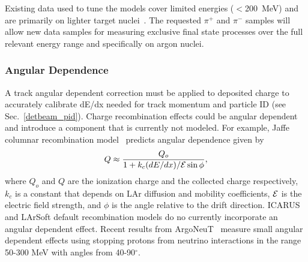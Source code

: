 Existing data used to tune the models
cover limited energies ($<$200~MeV) and are primarily on lighter target nuclei~\cite{fsirev}.
The requested $\pi^+$ and $\pi^-$ samples will allow new data samples for measuring
exclusive final state processes over the full relevant energy range and specifically on argon nuclei. 



 


\subsubsection{Angular Dependence}

\label{sec_angle}


A track angular dependent correction must be
applied to deposited charge to accurately calibrate
dE/dx needed for track momentum and particle ID (see Sec.~\ref{detbeam_pid}). 
Charge recombination effects could be angular dependent and
introduce a component that
is currently not modeled. 
For example, Jaffe columnar recombination model~\cite{jaffe,eqref} predicts 
angular dependence given by 
$$Q \approx \frac{Q_o}{1+k_c (dE/dx) / {\cal E} \sin\phi}, $$ 
where
$Q_o$ and $Q$ are the ionization charge and the collected charge respectively, 
$k_c$ is a constant that depends on LAr diffusion and mobility coefficients, $\cal E$ 
is the electric field strength, and $\phi$ is the angle relative to the drift direction.
%
ICARUS and LArSoft default recombination models do no currently incorporate 
an angular dependent effect. 
Recent results from ArgoNeuT~\cite{argoneut_angle} measure small angular dependent effects using 
stopping protons from neutrino interactions in the range 50-300 MeV with angles from 40-90$^{\circ}$.

